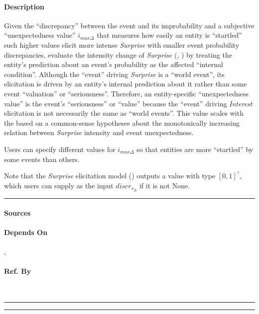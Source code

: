 \paragraph{Description} Given the ``discrepancy'' between the event and its
improbability and a subjective ``unexpectedness value''
$i_{\mathit{max}\Delta}$ that measures how easily an entity is ``startled''
such higher values elicit more intense \textit{Surprise} with smaller event
probability discrepancies, evaluate the intensity change of \textit{Surprise}
(, ) by treating the
entity's prediction about an event's probability as the affected ``internal
condition''. Although the ``event'' driving \textit{Surprise} is a ``world
event'', its elicitation is driven by an entity's internal prediction about it
rather than some event ``valuation'' or ``seriousness''. Therefore, an
entity-specific ``unexpectedness value'' is the event's ``seriousness'' or
``value'' because the ``event'' driving \textit{Interest} elicitation is not
necessarily the same as ``world events''. This value scales with the based on a
common-sense hypotheses about the monotonically increasing relation between
\textit{Surprise} intensity and event unexpectedness.

Users can specify different values for $i_{\mathit{max}\Delta}$ so that
entities are more ``startled'' by some events than others.

Note that the \textit{Surprise} elicitation model
() outputs a value with type $[0,1]^?$,
which users can supply as the input $\mathit{discr}_{s_\Delta}$ if it is not
None. \\\hrule

\paragraph{Sources} \citet[p.~54, 56]{reisenzein2019cognitive}

\paragraph{Depends On} ,

\paragraph{Ref. By}  \\\hrule\vspace{0.5mm}\hrule

